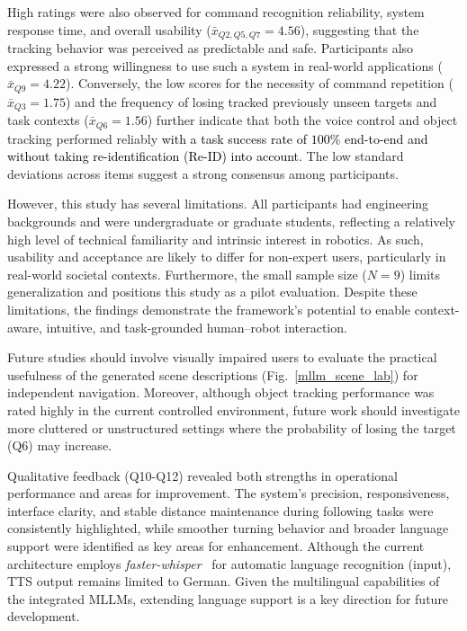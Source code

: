 \documentclass[lettersize,journal]{IEEEtran}
\begin{document}
High ratings were also observed for command recognition reliability, system response time, and overall usability ($\bar{x}_{Q2,Q5,Q7} = 4.56$), suggesting that the tracking behavior was perceived as predictable and safe. Participants also expressed a strong willingness to use such a system in real-world applications ($\bar{x}_{Q9} = 4.22$). Conversely, the low scores for the necessity of command repetition ($\bar{x}_{Q3} = 1.75$) and the frequency of losing  tracked   previously unseen targets and task contexts ($\bar{x}_{Q6} = 1.56$) further indicate that both the voice control and object tracking performed reliably \textcolor{black}{with a task success rate of $100\%$ end-to-end and without taking re-identification (Re-ID) into account.} The low standard deviations across items suggest a strong consensus among participants.

However, this study has several limitations. All participants had engineering backgrounds and were undergraduate or graduate students, reflecting a relatively high level of technical familiarity and intrinsic interest in robotics. As such, usability and acceptance are likely to differ for non-expert users, particularly in real-world societal contexts. Furthermore, the small sample size ($N=9$) limits generalization and positions this study as a pilot evaluation. Despite these limitations, the findings demonstrate the framework’s potential to enable context-aware, intuitive, and task-grounded human–robot interaction.

Future studies should involve visually impaired users to evaluate the practical usefulness of the generated scene descriptions (Fig.~\ref{mllm_scene_lab}) for independent navigation. Moreover, although object tracking performance was rated highly in the current controlled environment, future work should investigate more cluttered or unstructured settings where the probability of losing the target (Q6) may increase.

Qualitative feedback (Q10-Q12) revealed both strengths in operational performance and areas for improvement. The system’s precision, responsiveness, interface clarity, and stable distance maintenance during following tasks were consistently highlighted, while smoother turning behavior and broader language support were identified as key areas for enhancement. Although the current architecture employs \textit{faster-whisper}~\cite{fasterwhisper} for automatic language recognition (input), TTS output remains limited to German. Given the multilingual capabilities of the integrated MLLMs, extending language support is a key direction for future development.
\end{document}
